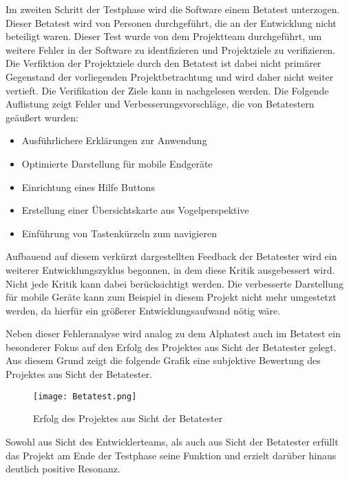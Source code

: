 Im zweiten Schritt der Testphase wird die Software einem Betatest unterzogen. Dieser Betatest wird von Personen
durchgeführt, die an der Entwicklung nicht beteiligt waren. Dieser Test wurde von dem Projektteam durchgeführt,
um weitere Fehler in der Software zu identfizieren und Projektziele zu verifizieren. Die Verfiktion der Projektziele
durch den Betatest ist dabei nicht primärer Gegenstand der vorliegenden Projektbetrachtung und wird daher
nicht weiter vertieft. Die Verifikation der Ziele kann in \citet{unternehmensfuehrung2014} nachgelesen werden.
Die Folgende Auflistung zeigt Fehler und Verbesserungsvorschläge, die von Betatestern geäußert wurden:

\begin{itemize}
  \item Ausführlichere Erklärungen zur Anwendung
  \item Optimierte Darstellung für mobile Endgeräte
  \item Einrichtung eines Hilfe Buttons
  \item Erstellung einer Übersichtskarte aus Vogelperspektive
  \item Einführung von Tastenkürzeln zum navigieren
\end{itemize}

Aufbauend auf diesem verkürzt dargestellten Feedback der Betatester wird ein weiterer Entwicklungszyklus begonnen, in dem
diese Kritik ausgebessert wird. Nicht jede Kritik kann dabei berücksichtigt werden. Die verbesserte Darstellung für
mobile Geräte kann zum Beispiel in diesem Projekt nicht mehr umgestetzt werden, da hierfür ein größerer
Entwicklungsaufwand nötig wäre.

Neben dieser Fehleranalyse wird analog zu dem Alphatest auch im Betatest ein besonderer Fokus auf den
Erfolg des Projektes aus Sicht der Betatester gelegt. Aus diesem Grund zeigt die folgende Grafik eine subjektive
Bewertung des Projektes aus Sicht der Betatester.

\begin{figure}[htb]
\centering
\texttt{[image: Betatest.png]}
\caption[Alphatest Auswertung]{Erfolg des Projektes aus Sicht der Betatester\protect\footnotemark}
\label{fig:Betatest}
\end{figure}

Sowohl aus Sicht des Entwicklerteams, als auch aus Sicht der Betatester erfüllt das Projekt am Ende der Testphase
seine Funktion und erzielt darüber hinaus deutlich positive Resonanz.